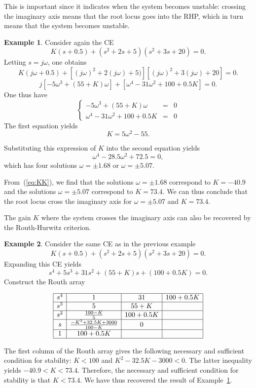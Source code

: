 \documentclass[a4paper,11pt]{report}
\theoremstyle{definition}
\newtheorem{mdexample}{Example}
\newenvironment{example}%
  {\vspace{0.1cm}\begin{mdframed}[backgroundcolor=lightgray]\begin{mdexample}}%
  {\end{mdexample}\end{mdframed}\vspace{0.1cm}}
\begin{document}
This is important since it indicates when the system becomes unstable:
crossing the imaginary axis means that the root locus goes into the
RHP, which in turn means that the system becomes unstable.

\begin{example}
  \label{ex:crossing}
  Consider again the CE
  \[
  K(s+0.5) + (s^2+2s+5)(s^2+3s+20) = 0.
  \]
  Letting $s=j\omega$, one obtains
  \[
  K(j\omega+0.5) + [(j\omega)^2+2(j\omega)+5)][(j\omega)^2+3(j\omega)+20] = 0.
  \]
  \[
  j[-5\omega^3+(55+K)\omega] + [\omega^4-31\omega^2+100+0.5K] = 0.
  \]
  One thus have
  \[
  \left\{
  \begin{array}{lcr}
    -5\omega^3+(55+K)\omega &=& 0 \\
    \omega^4-31\omega^2+100+0.5K  &=& 0
  \end{array}
  \right.
  \]
  The first equation yields
  \begin{equation}
    \label{eq:KK}
    K = 5\omega^2-55.
  \end{equation}
  
  Substituting this expression of $K$ into the second equation yields
  \[
  \omega^4-28.5\omega^2+72.5=0,
  \]
  which has four solutions $\omega=\pm 1.68$ or $\omega=\pm 5.07$.
  
  From~(\ref{eq:KK}), we find that the solutions $\omega=\pm 1.68$
  correspond to $K=-40.9$ and the solutions $\omega=\pm 5.07$
  correspond to $K=73.4$. We can thus conclude that the root locus
  cross the imaginary axis for $\omega=\pm 5.07$ and $K=73.4$.
\end{example}

The gain $K$ where the system crosses the imaginary axis can also be
recovered by the Routh-Hurwitz criterion. 

\begin{example}
  Consider the same CE as in the previous example
  \[
  K(s+0.5) + (s^2+2s+5)(s^2+3s+20) = 0.
  \]
  Expanding this CE yields
  \[
  s^4+5s^3+31s^2+(55+K)s+(100+0.5K) = 0.
  \]
  Construct the Routh array

  \[
  \begin{array}{|c|c|c|c|}
    \hline
    s^4 & 1 & 31 &  100+0.5K\\
    \hline
    s^3 & 5 & 55+K &  \\
    \hline
    s^2 & \frac{100-K}{5} & 100+0.5K &\\
    \hline
    s & \frac{-K^2+32.5K+3000}{100-K}&0 & \\
    \hline
    1 & 100+0.5K& & \\
    \hline
  \end{array}
  \]
  
  The first column of the Routh array gives the following necessary
  and sufficient condition for stability: $K<100$ and
  $K^2-32.5K-3000<0$. The latter inequality yields
  $-40.9<K<73.4$. Therefore, the necessary and sufficient condition
  for stability is that $K<73.4$. We have thus recovered the result of
  Example~\ref{ex:crossing}.
\end{example}
\end{document}

